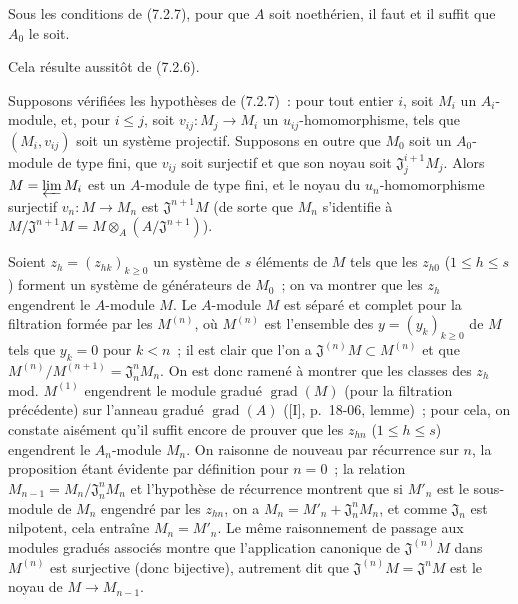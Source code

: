 \begin{corollary}[7.2.8]
\label{0.7.2.8-fr}
Sous les conditions de (7.2.7), pour que $A$ soit noethérien, il faut et il
suffit que $A_0$ le soit.
\end{corollary}

Cela résulte aussitôt de (7.2.6).

\begin{proposition}[7.2.9]
\label{0.7.2.9-fr}
Supposons vérifiées les hypothèses de (7.2.7)~: pour tout entier $i$, soit
$M_i$ un $A_i$-module, et, pour $i\leq j$, soit
$v_{ij}:M_j\to M_i$ un $u_{ij}$-homomorphisme, tels que $(M_i,v_{ij})$ soit un
système projectif. Supposons en outre que $M_0$ soit un $A_0$-module de type
fini, que $v_{ij}$ soit surjectif et que son noyau soit
$\mathfrak J_j^{i+1}M_j$. Alors $M=\varprojlim M_i$ est un $A$-module de type
fini, et le noyau du $u_n$-homomorphisme surjectif $v_n:M\to M_n$ est
$\mathfrak J^{n+1}M$ (de sorte que $M_n$ s'identifie à
$M/\mathfrak J^{n+1}M=M\otimes_A(A/\mathfrak J^{n+1})$).
\end{proposition}

Soient $z_h=(z_{hk})_{k\geq0}$ un système de $s$ éléments de $M$ tels que les
$z_{h0}$ ($1\leq h\leq s$) forment un système de générateurs de $M_0$~; on va
montrer que les $z_h$ engendrent le $A$-module $M$. Le $A$-module $M$ est
séparé et complet pour la filtration formée par les $M^{(n)}$, où $M^{(n)}$
est l'ensemble des $y=(y_k)_{k\geq0}$ de $M$ tels que $y_k=0$ pour $k<n$~;
il est clair que l'on a $\mathfrak J^{(n)}M\subset M^{(n)}$ et que
$M^{(n)}/M^{(n+1)}=\mathfrak J_n^nM_n$. On est donc ramené à montrer que les
classes des $z_h$ mod. $M^{(1)}$ engendrent le module gradué
$\operatorname{grad}(M)$ (pour la filtration précédente) sur l'anneau gradué
$\operatorname{grad}(A)$ ([I], p.~18-06, lemme)~; pour cela, on constate
aisément qu'il suffit encore de prouver que les $z_{hn}$ ($1\leq h\leq s$)
engendrent le $A_n$-module $M_n$. On raisonne de nouveau par récurrence sur
$n$, la proposition étant évidente par définition pour $n=0$~; la relation
$M_{n-1}=M_n/\mathfrak J_n^nM_n$ et l'hypothèse de récurrence montrent que si
$M'_n$ est le sous-module de $M_n$ engendré par les $z_{hn}$, on a
$M_n=M'_n+\mathfrak J_n^nM_n$, et comme $\mathfrak J_n$ est nilpotent, cela
entraîne $M_n=M'_n$. Le même raisonnement de passage aux modules gradués
associés montre que l'application canonique de $\mathfrak J^{(n)}M$ dans
$M^{(n)}$ est surjective (donc bijective), autrement dit que
$\mathfrak J^{(n)}M=\mathfrak J^nM$ est le noyau de $M\to M_{n-1}$.

